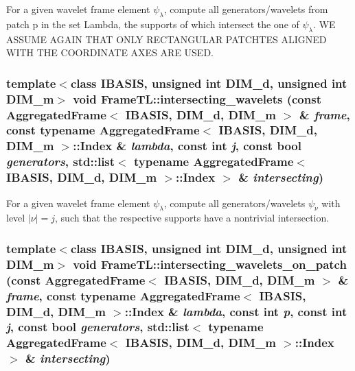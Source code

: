 For a given wavelet frame element $\psi_\lambda$, compute all generators/wavelets from patch p in the set Lambda, the supports of which intersect the one of $\psi_\lambda$. WE ASSUME AGAIN THAT ONLY RECTANGULAR PATCHTES ALIGNED WITH THE COORDINATE AXES ARE USED. \hypertarget{namespaceFrameTL_1823fb7effb657b388e652efbef319b3}{
\subsubsection[intersecting\_\-wavelets]{\setlength{\rightskip}{0pt plus 5cm}template$<$class IBASIS, unsigned int DIM\_\-d, unsigned int DIM\_\-m$>$ void FrameTL::intersecting\_\-wavelets (const AggregatedFrame$<$ IBASIS, DIM\_\-d, DIM\_\-m $>$ \& {\em frame}, \/  const typename AggregatedFrame$<$ IBASIS, DIM\_\-d, DIM\_\-m $>$::Index \& {\em lambda}, \/  const int {\em j}, \/  const bool {\em generators}, \/  std::list$<$ typename AggregatedFrame$<$ IBASIS, DIM\_\-d, DIM\_\-m $>$::Index $>$ \& {\em intersecting})}}
\label{namespaceFrameTL_1823fb7effb657b388e652efbef319b3}


For a given wavelet frame element $\psi_\lambda$, compute all generators/wavelets $\psi_\nu$ with level $|\nu|=j$, such that the respective supports have a nontrivial intersection. \hypertarget{namespaceFrameTL_e57f8b33a1d5167ca7a23c7762e9ad1a}{
\subsubsection[intersecting\_\-wavelets\_\-on\_\-patch]{\setlength{\rightskip}{0pt plus 5cm}template$<$class IBASIS, unsigned int DIM\_\-d, unsigned int DIM\_\-m$>$ void FrameTL::intersecting\_\-wavelets\_\-on\_\-patch (const AggregatedFrame$<$ IBASIS, DIM\_\-d, DIM\_\-m $>$ \& {\em frame}, \/  const typename AggregatedFrame$<$ IBASIS, DIM\_\-d, DIM\_\-m $>$::Index \& {\em lambda}, \/  const int {\em p}, \/  const int {\em j}, \/  const bool {\em generators}, \/  std::list$<$ typename AggregatedFrame$<$ IBASIS, DIM\_\-d, DIM\_\-m $>$::Index $>$ \& {\em intersecting})}}
\label{namespaceFrameTL_e57f8b33a1d5167ca7a23c7762e9ad1a}


